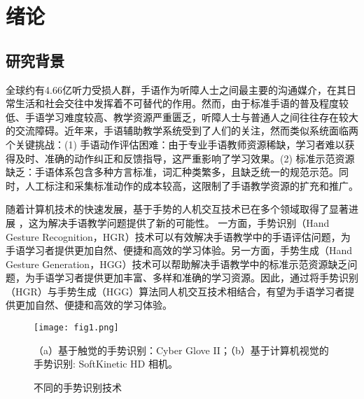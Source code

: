 
\chapter{绪论}
\label{sec:intro}

\section{研究背景}
全球约有4.66亿听力受损人群，手语作为听障人士之间最主要的沟通媒介，在其日常生活和社会交往中发挥着不可替代的作用。然而，由于标准手语的普及程度较低、手语学习难度较高、教学资源严重匮乏，听障人士与普通人之间往往存在较大的交流障碍。近年来，手语辅助教学系统受到了人们的关注，然而类似系统面临两个关键挑战：(1) 手语动作评估困难：由于专业手语教师资源稀缺，学习者难以获得及时、准确的动作纠正和反馈指导，这严重影响了学习效果。(2) 标准示范资源缺乏：手语体系包含多种方言标准，词汇种类繁多，且缺乏统一的规范示范。同时，人工标注和采集标准动作的成本较高，这限制了手语教学资源的扩充和推广。

随着计算机技术的快速发展，基于手势的人机交互技术已在多个领域取得了显著进展 \cite{伍杰2019基于视觉的实时手势识别方法研究, desai2017human,strickland2013using}，这为解决手语教学问题提供了新的可能性。
一方面，手势识别（Hand Gesture Recognition，HGR）技术可以有效解决手语教学中的手语评估问题，为手语学习者提供更加自然、便捷和高效的学习体验。另一方面，手势生成（Hand Gesture Generation，HGG）技术可以帮助解决手语教学中的标准示范资源缺乏问题，为手语学习者提供更加丰富、多样和准确的学习资源。因此，通过将手势识别（HGR）与手势生成（HGG）算法同人机交互技术相结合，有望为手语学习者提供更加自然、便捷和高效的学习体验。

\begin{figure}
  \centering
  \texttt{[image: fig1.png]}
  \caption*{（a）基于触觉的手势识别：Cyber Glove II\cite{kevin2004}；（b）基于计算机视觉的手势识别: SoftKinetic HD 相机\cite{iisuSDK2012}。}
  \caption{不同的手势识别技术}
  \label{fig:gesture_techniques}
\end{figure}

